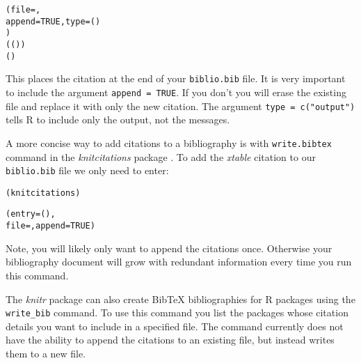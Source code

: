 \begin{knitrout}
\color{fgcolor}\begin{kframe}
\begin{alltt}
(file = , 
     append = TRUE, type = ()
     )      
(()) 
()
\end{alltt}
\end{kframe}
\end{knitrout}


\noindent This places the citation at the end of your \texttt{biblio.bib} file. It is very important to include the argument \texttt{append = TRUE}. If you don't you will erase the existing file and replace it with only the new citation. The argument \texttt{type = c("output")} tells R to include only the output, not the messages.

A more concise way to add citations to a bibliography is with \texttt{write.bibtex} command in the \emph{knitcitations} package \cite[]{R-knitcitations}. To add the \emph{xtable} citation to our \texttt{biblio.bib} file we only need to enter:

\begin{knitrout}
\color{fgcolor}\begin{kframe}
\begin{alltt}
(knitcitations)
 
(entry = (), 
              file = , append = TRUE)
\end{alltt}
\end{kframe}
\end{knitrout}


\noindent Note, you will likely only want to append the citations once. Otherwise your bibliography document will grow with redundant information every time you run this command.

The {\emph{knitr}} package can also create BibTeX bibliographies for R packages using the \texttt{write\_bib} command. To use this command you list the packages whose citation details you want to include in a specified file. The command currently does not have the ability to append the citations to an existing file, but instead writes them to a new file.

